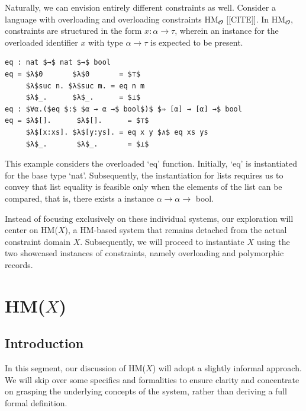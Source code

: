 \documentclass[runningheads]{llncs}
\newcommand{\hmx}{HM($X$)}
\begin{document}
Naturally, we can envision entirely different constraints as well.
Consider a language with overloading and overloading constraints
HM$_𝓞$ [[CITE]].
In HM$_𝓞$, constraints are structured in the form $x : α → τ$,
wherein an instance for the overloaded identifier $x$ with type $α → τ$ is
expected to be present.
\begin{example}
  \begin{lstlisting}
eq : nat $→$ nat $→$ bool
eq = $λ$0       $λ$0       = $⊤$
     $λ$suc n. $λ$suc m. = eq n m 
     $λ$_.      $λ$_.      = $⊥$
eq : $∀α.($eq $:$ $α → α →$ bool$)$ $⇒ [α] → [α] →$ bool
eq = $λ$[].      $λ$[].      = $⊤$
     $λ$[x:xs]. $λ$[y:ys]. = eq x y $∧$ eq xs ys
     $λ$_.       $λ$_.       = $⊥$
  \end{lstlisting}
\end{example}
This example considers the overloaded `eq' function.
Initially, `eq' is instantiated for the base type `nat'.
Subsequently, the instantiation for lists requires us to convey that list
equality is feasible only when
the elements of the list can be compared, that is, there exists a instance $α →
  α →$ bool.

Instead of focusing exclusively on these individual systems, our exploration
will center on \hmx{}, a HM-based system that remains detached from
the actual constraint domain $X$.
Subsequently, we will proceed to instantiate $X$ using the two showcased
instances of constraints, namely overloading and polymorphic records.

\section{\hmx{}}

\subsection{Introduction}
In this segment, our discussion of \hmx{} will adopt a slightly informal
approach.
We will skip over some specifics and formalities to ensure clarity and
concentrate on
grasping the underlying concepts of the system, rather than deriving a full
formal definition.
\end{document}
